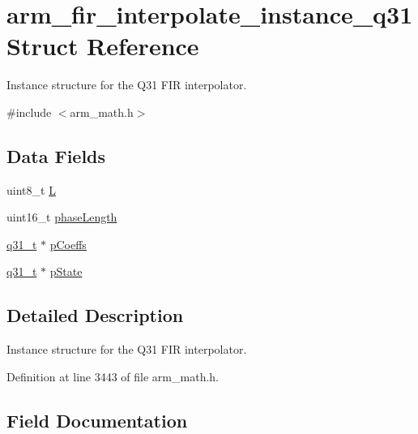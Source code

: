 \hypertarget{structarm__fir__interpolate__instance__q31}{}\section{arm\+\_\+fir\+\_\+interpolate\+\_\+instance\+\_\+q31 Struct Reference}
\label{structarm__fir__interpolate__instance__q31}


Instance structure for the Q31 F\+IR interpolator.  




{\ttfamily \#include $<$arm\+\_\+math.\+h$>$}

\subsection*{Data Fields}
\begin{DoxyCompactItemize}
\item 
uint8\+\_\+t \hyperlink{structarm__fir__interpolate__instance__q31_aee73cc056696e504430c53eaa9c58cf0}{L}
\item 
uint16\+\_\+t \hyperlink{structarm__fir__interpolate__instance__q31_a8f92bb07e0812f94679438cdf412b26a}{phase\+Length}
\item 
\hyperlink{arm__math_8h_adc89a3547f5324b7b3b95adec3806bc0}{q31\+\_\+t} $\ast$ \hyperlink{structarm__fir__interpolate__instance__q31_a68888e36167d81cb7836db10367a1682}{p\+Coeffs}
\item 
\hyperlink{arm__math_8h_adc89a3547f5324b7b3b95adec3806bc0}{q31\+\_\+t} $\ast$ \hyperlink{structarm__fir__interpolate__instance__q31_adee4ba3ee8869865af7d8fa08ca913d6}{p\+State}
\end{DoxyCompactItemize}


\subsection{Detailed Description}
Instance structure for the Q31 F\+IR interpolator. 

Definition at line 3443 of file arm\+\_\+math.\+h.



\subsection{Field Documentation}
